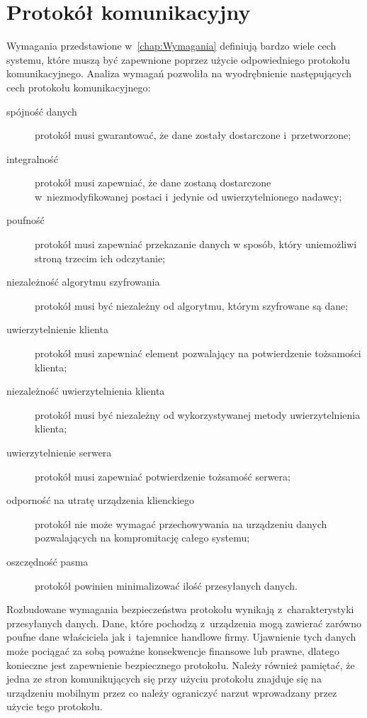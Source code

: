 \section[Protokół komunikacyjny][Protokół komunikacyjny]{Protokół komunikacyjny}
\label{sec:ProtKom}

Wymagania przedstawione w~\ref{chap:Wymagania} definiują bardzo wiele
cech systemu, które muszą być zapewnione poprzez użycie odpowiedniego
protokołu komunikacyjnego. Analiza wymagań pozwoliła na wyodrębnienie
następujących cech protokołu komunikacyjnego:

\begin{description}
\item[spójność danych] protokół musi gwarantować, że dane zostały
  dostarczone i~przetworzone;
\item[integralność] protokół musi zapewniać, że dane zostaną
  dostarczone w~niezmodyfikowanej postaci i~jedynie od
  uwierzytelnionego nadawcy;
\item[poufność] protokół musi zapewniać przekazanie danych w sposób,
  który uniemożliwi stroną trzecim ich odczytanie;
\item[niezależność algorytmu szyfrowania] protokół musi być niezależny
  od algorytmu, którym szyfrowane są dane;
\item[uwierzytelnienie klienta] protokół musi zapewniać element
  pozwalający na potwierdzenie tożsamości klienta;
\item[niezależność uwierzytelnienia klienta] protokół musi być
  niezależny od wykorzystywanej metody uwierzytelnienia klienta;
\item[uwierzytelnienie serwera] protokół musi zapewniać potwierdzenie
  tożsamość serwera;
\item[odporność na utratę urządzenia klienckiego] protokół nie może
  wymagać przechowywania na urządzeniu danych pozwalających na
  kompromitację całego systemu;
\item[oszczędność pasma] protokół powinien minimalizować ilość
  przesyłanych danych.
\end{description}

Rozbudowane wymagania bezpieczeństwa protokołu wynikają
z~charakterystyki przesyłanych danych. Dane, które pochodzą
z~urządzenia mogą zawierać zarówno poufne dane właściciela jak
i~tajemnice handlowe firmy. Ujawnienie tych danych może pociągać za
sobą poważne konsekwencje finansowe lub prawne, dlatego konieczne jest
zapewnienie bezpiecznego protokołu. Należy również pamiętać, że jedna
ze stron komunikujących się przy użyciu protokołu znajduje się na
urządzeniu mobilnym przez co należy ograniczyć narzut wprowadzany
przez użycie tego protokołu.

